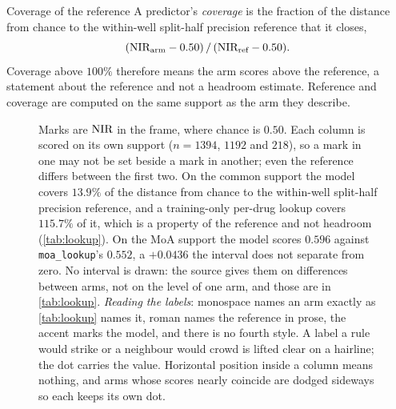 \begin{defn}{Coverage of the reference}
A predictor's \emph{coverage} is the fraction of the distance from chance to the
within-well split-half precision reference that it closes,
\[
  (\textrm{NIR}_{\text{arm}} - 0.50)\,/\,(\textrm{NIR}_{\text{ref}} - 0.50).
\]
Coverage above $100\%$ therefore means the arm scores above the reference, a
statement about the reference and not a headroom estimate. Reference and coverage
are computed on the same support as the arm they describe.
\end{defn}

\begin{figure}[htbp]
\centering

\caption[The baseline ladder]{ Marks are $\textrm{NIR}$ in the \Rframe{}
frame, where chance is $0.50$. Each column is scored on its own support
($n = \num{1394}$, $\num{1192}$ and $\num{218}$), so a mark in one may not be set
beside a mark in another; even the reference differs between the first two. On
the common support the model covers $13.9\%$ of the distance from chance to the
within-well split-half precision reference, and a training-only per-drug lookup
covers $115.7\%$ of it, which is a property of the reference and not headroom
(\cref{tab:lookup}). On the MoA support the model scores $0.596$ against
\texttt{moa\_lookup}'s $0.552$, a $+0.0436$ the interval does not separate from
zero. No interval is drawn: the source gives them on differences between arms,
not on the level of one arm, and those are in \cref{tab:lookup}. \emph{Reading
the labels}: monospace names an arm exactly as \cref{tab:lookup} names it, roman
names the reference in prose, the accent marks the model, and there is no fourth
style. A label a rule would strike or a neighbour would crowd is lifted clear on
a hairline; the dot carries the value. Horizontal position inside a column means
nothing, and arms whose scores nearly coincide are dodged sideways so each keeps
its own dot.}
\label{fig:ladder}
\end{figure}

